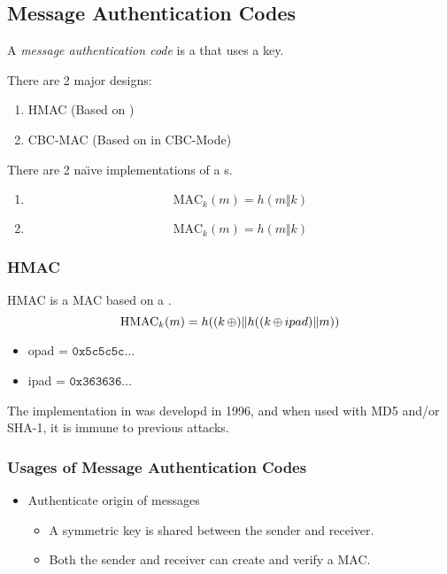 \subsection{Message Authentication Codes}\label{subsec:MACs}
\begin{definition}\label{def:MAC}
  A \emph{message authentication code} is a  that uses a key.
\end{definition}

There are 2 major designs:
\begin{enumerate}[noitemsep]
\item HMAC (Based on )
\item CBC-MAC (Based on  in CBC-Mode)
\end{enumerate}

There are 2 na\"{\i}ve implementations of a s.
\begin{enumerate}[noitemsep]
\item
  \begin{equation*}
    \text{MAC}_{k}(m) = h(m \Vert k)
  \end{equation*}
\item
  \begin{equation*}
    \text{MAC}_{k}(m) = h(m \Vert k)
  \end{equation*}
\end{enumerate}

\subsubsection{HMAC}\label{subsubsec:HMAC}
HMAC is a MAC based on a .
\begin{equation}\label{eq:HMAC}
  \text{HMAC}_{k}(m) = h((k \operatorname{\oplus}) \Vert h((k \operatorname{\oplus} ipad) \Vert m))
\end{equation}
\begin{itemize}[noitemsep]
\item opad = $\mathtt{0x5c5c5c} \ldots$
\item ipad = $\mathtt{0x363636} \ldots$
\end{itemize}

The implementation in  was developd in 1996, and when used with MD5 and/or SHA-1, it is immune to previous attacks.

\subsubsection{Usages of Message Authentication Codes}\label{subsubsec:MAC_Usages}
\begin{itemize}[noitemsep]
\item Authenticate origin of messages
  \begin{itemize}[noitemsep]
  \item A symmetric key is shared between the sender and receiver.
  \item Both the sender and receiver can create and verify a MAC.
  \end{itemize}
\end{itemize}

